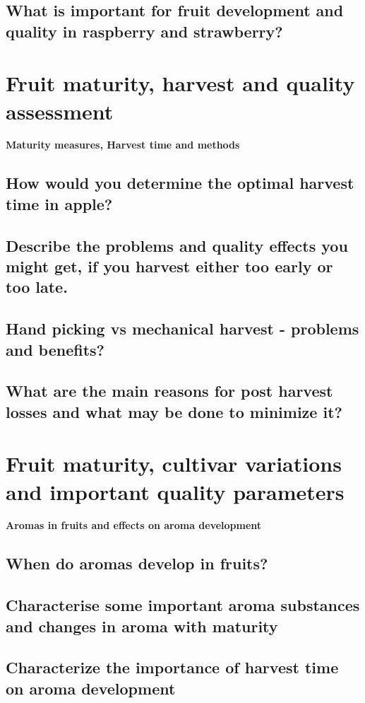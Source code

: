 \subsection{What is important for fruit development and quality in raspberry and strawberry?}


\vspace{1em}
\section{Fruit maturity, harvest and quality assessment}
\textbf{Maturity measures, Harvest time and methods}

\subsection{How would you determine the optimal harvest time in apple?}
\subsection{Describe the problems and quality effects you might get, if you harvest either too early or too late.}
\subsection{Hand picking vs mechanical harvest - problems and benefits?}
\subsection{What are the main reasons for post harvest losses and what may be done to minimize it?}


\vspace{1em}
\section{Fruit maturity, cultivar variations and important quality parameters}
\textbf{Aromas in fruits and effects on aroma development}

\subsection{When do aromas develop in fruits?}
\subsection{Characterise some important aroma substances and changes in aroma with maturity}
\subsection{Characterize the importance of harvest time on aroma development}
